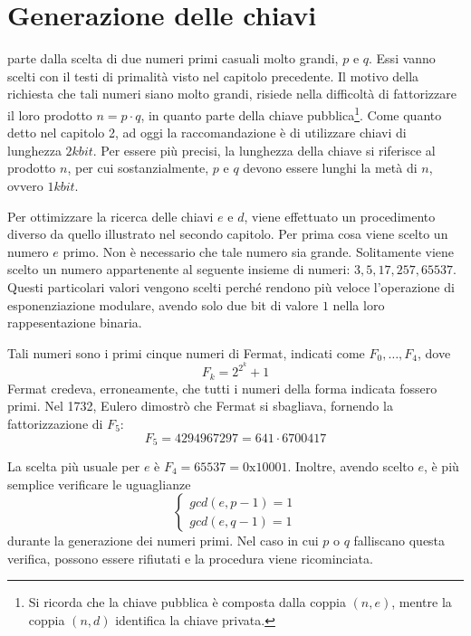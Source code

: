 
\chapter{Generazione delle chiavi}

 parte dalla scelta di due numeri primi casuali molto grandi, $p$ e $q$. Essi vanno scelti con il testi di primalità visto nel capitolo precedente. Il motivo della richiesta che tali numeri siano molto grandi, risiede nella difficoltà di fattorizzare il loro prodotto $n = p \cdot q$, in quanto parte della chiave pubblica\footnote{Si ricorda che la chiave pubblica è composta dalla coppia $(n, e)$, mentre la coppia $(n, d)$ identifica la chiave privata.}. Come quanto detto nel capitolo 2, ad oggi la raccomandazione è di utilizzare chiavi di lunghezza $2kbit$. Per essere più precisi, la lunghezza della chiave si riferisce al prodotto $n$, per cui sostanzialmente, $p$ e $q$ devono essere lunghi la metà di $n$, ovvero $1kbit$.

Per ottimizzare la ricerca delle chiavi $e$ e $d$, viene effettuato un procedimento diverso da quello illustrato nel secondo capitolo. Per prima cosa viene scelto un numero $e$ primo. Non è necessario che tale numero sia grande. Solitamente viene scelto un numero appartenente al seguente insieme di numeri: ${3, 5, 17, 257, 65537}$. Questi particolari valori vengono scelti perché rendono più veloce l'operazione di esponenziazione modulare, avendo solo due bit di valore $1$ nella loro rappesentazione binaria.

Tali numeri sono i primi cinque numeri di Fermat, indicati come $F_0, \dotsc, F_4$, dove \[ F_k = 2^{2^k} + 1 \] Fermat credeva, erroneamente, che tutti i numeri della forma indicata fossero primi. Nel 1732, Eulero dimostrò che Fermat si sbagliava, fornendo la fattorizzazione di $F_5$: \[ F_5 = 4294967297 = 641 \cdot 6700417 \]

La scelta più usuale per $e$ è $F_4 = 65537 = 0\text{x}10001$. Inoltre, avendo scelto $e$, è più semplice verificare le uguaglianze
\begin{equation}
	\label{eqn:sistemaE}
	\begin{cases}
		gcd(e, p - 1) = 1 \\
		gcd(e, q - 1) = 1 
	\end{cases}
\end{equation}
durante la generazione dei numeri primi. Nel caso in cui $p$ o $q$ falliscano questa verifica, possono essere rifiutati e la procedura viene ricominciata.

